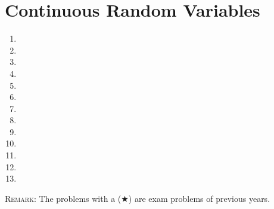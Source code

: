 \documentclass[a4paper,titlepage]{article}
\begin{document}
\section{Continuous Random Variables}
\begin{enumerate}[leftmargin=*,resume]
\item {}
\item {}
\item {}
\item {}
\item {}
\item {}
\item {}
\item {}
\item {}
\item {}
\item {}
\item {}
\item {}
\end{enumerate}

\vspace{2cm}

\textsc{Remark}: The problems with a ($\bigstar$) are exam problems of previous years.
\end{document}
